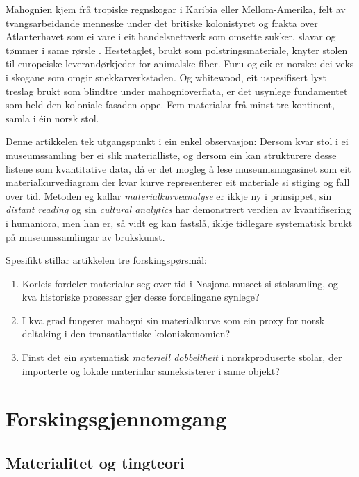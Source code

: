 \documentclass[12pt,a4paper]{article}
\begin{document}
Mahognien kjem fr\aa{} tropiske regnskogar i Karibia eller Mellom-Amerika, felt av tvangsarbeidande menneske under det britiske kolonistyret og frakta over Atlanterhavet som ei vare i eit handelsnettverk som omsette sukker, slavar og t\o{}mmer i same r\o{}rsle \citep{anderson2012}. Hestetaglet, brukt som polstringsmateriale, knyter stolen til europeiske leverandørkjeder for animalske fiber. Furu og eik er norske: dei veks i skogane som omgir snekkarverkstaden. Og whitewood, eit uspesifisert lyst treslag brukt som blindtre under mahognioverflata, er det usynlege fundamentet som held den koloniale fasaden oppe. Fem materialar fr\aa{} minst tre kontinent, samla i \'ein norsk stol.

Denne artikkelen tek utgangspunkt i ein enkel observasjon: Dersom kvar stol i ei museumssamling ber ei slik materialliste, og dersom ein kan strukturere desse listene som kvantitative data, d\aa{} er det mogleg \aa{} lese museumsmagasinet som eit materialkurvediagram der kvar kurve representerer eit materiale si stiging og fall over tid. Metoden eg kallar \emph{materialkurveanalyse} er ikkje ny i prinsippet, \citet{moretti2005} sin \emph{distant reading} og \citet{manovich2020} sin \emph{cultural analytics} har demonstrert verdien av kvantifisering i humaniora, men han er, s\aa{} vidt eg kan fastsl\aa{}, ikkje tidlegare systematisk brukt p\aa{} museumssamlingar av brukskunst.

Spesifikt stillar artikkelen tre forskingsp\o{}rsm\aa{}l:
\begin{enumerate}
    \item Korleis fordeler materialar seg over tid i Nasjonalmuseet si stolsamling, og kva historiske prosessar gjer desse fordelingane synlege?
    \item I kva grad fungerer mahogni sin materialkurve som ein proxy for norsk deltaking i den transatlantiske koloniøkonomien?
    \item Finst det ein systematisk \emph{materiell dobbeltheit} i norskproduserte stolar, der importerte og lokale materialar sameksisterer i same objekt?
\end{enumerate}

\section{Forskingsgjennomgang}

\subsection{Materialitet og tingteori}
\end{document}
